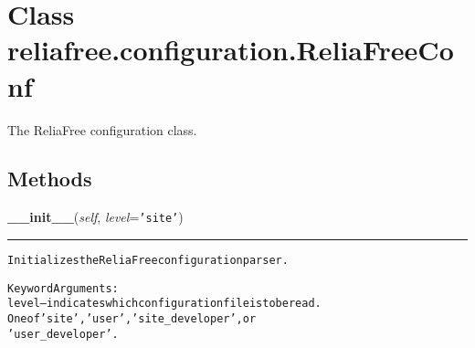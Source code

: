 %
%
%


\section{Class reliafree.configuration.ReliaFreeConf}

    \label{reliafree:configuration:ReliaFreeConf}
The ReliaFree configuration class.



  \subsection{Methods}

    \label{reliafree:configuration:ReliaFreeConf:__init__}

    \vspace{0.5ex}

\hspace{.8\funcindent}\begin{boxedminipage}{\funcwidth}

    \raggedright \textbf{\_\_init\_\_}(\textit{self}, \textit{level}={\tt \texttt{'}\texttt{site}\texttt{'}})

    \vspace{-1.5ex}

    \rule{\textwidth}{0.5\fboxrule}
\setlength{\parskip}{2ex}
\begin{alltt}
Initializes the ReliaFree configuration parser.

Keyword Arguments:
level -- indicates which configuration file is to be read.
         One of 'site', 'user', 'site\_developer', or
         'user\_developer'.
\end{alltt}

\setlength{\parskip}{1ex}
    \end{boxedminipage}

